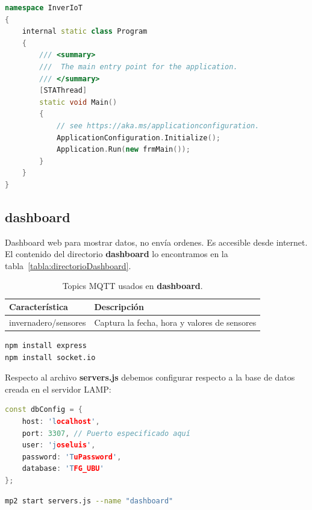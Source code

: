 \begin{lstlisting}[language=cpp, firstnumber=0, basicstyle=\normalsize, caption={Contenido de Program.cs.}] 
namespace InverIoT
{
    internal static class Program
    {
        /// <summary>
        ///  The main entry point for the application.
        /// </summary>
        [STAThread]
        static void Main()
        {
            // see https://aka.ms/applicationconfiguration.
            ApplicationConfiguration.Initialize();
            Application.Run(new frmMain());
        }
    }
}
\end{lstlisting}

\subsection{dashboard}
Dashboard web para mostrar datos, no envía ordenes. Es accesible desde internet.
El contenido del directorio \textbf{dashboard} lo encontramos en la tabla~\ref{tabla:directorioDashboard}.

\begin{table}[htbp]
\begin{center}
\caption{Topics MQTT usados en \textbf{dashboard}.}
\begin{tabular}{|l|l|} %
\hline
\rowcolor[HTML]{C0C0C0} 
\textbf{Característica} & \textbf{Descripción}\\ \hline
invernadero/sensores &  Captura la fecha, hora y valores de sensores\\ \hline
\end{tabular}
\end{center}
\end{table}


\begin{lstlisting}[language=sh, firstnumber=0, basicstyle=\normalsize, caption={Instalaciones necesarias.}] 
npm install express
npm install socket.io
\end{lstlisting}

Respecto al archivo \textbf{servers.js} debemos configurar respecto a la base de datos creada en el servidor LAMP:

\begin{lstlisting}[language=cpp, firstnumber=0, basicstyle=\normalsize, caption={Configuración de base de datos.}] 
const dbConfig = {
    host: 'localhost',
    port: 3307, // Puerto especificado aquí
    user: 'joseluis',
    password: 'TuPassword',
    database: 'TFG_UBU'
};
\end{lstlisting}

\begin{lstlisting}[language=sh, firstnumber=0, basicstyle=\normalsize, caption={Ejecución.}] 
mp2 start servers.js --name "dashboard"
\end{lstlisting}

